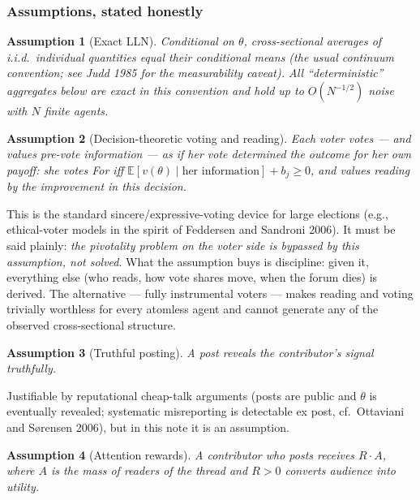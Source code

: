 \documentclass[12pt]{article}
\newtheorem{assumption}{Assumption}
\newcommand{\E}{\mathbb{E}}
\begin{document}
\subsubsection{Assumptions, stated honestly}

\begin{assumption}[Exact LLN]\label{app:ass:lln}
Conditional on $\theta$, cross-sectional averages of i.i.d.\ individual
quantities equal their conditional means (the usual continuum convention; see
Judd 1985 for the measurability caveat). All ``deterministic'' aggregates below
are exact in this convention and hold up to $O(N^{-1/2})$ noise with $N$ finite
agents.
\end{assumption}

\begin{assumption}[Decision-theoretic voting and reading]\label{app:ass:sincere}
Each voter votes --- and values pre-vote information --- \emph{as if her vote
determined the outcome for her own payoff}: she votes For iff
$\E[v(\theta)\mid\text{her information}]+b_j\ge 0$, and values reading by the
improvement in this decision.
\end{assumption}

This is the standard sincere/expressive-voting device for large elections
(e.g., ethical-voter models in the spirit of Feddersen and Sandroni 2006). It
must be said plainly: \emph{the pivotality problem on the voter side is bypassed
by this assumption, not solved}. What the assumption buys is discipline: given
it, everything else (who reads, how vote shares move, when the forum dies) is
derived. The alternative --- fully instrumental voters --- makes reading and
voting trivially worthless for every atomless agent and cannot generate any of
the observed cross-sectional structure.

\begin{assumption}[Truthful posting]\label{app:ass:truth}
A post reveals the contributor's signal truthfully.
\end{assumption}

Justifiable by reputational cheap-talk arguments (posts are public and
$\theta$ is eventually revealed; systematic misreporting is detectable ex post,
cf.\ Ottaviani and S{\o}rensen 2006), but in this note it is an assumption.

\begin{assumption}[Attention rewards]\label{app:ass:attention}
A contributor who posts receives $R\cdot A$, where $A$ is the mass of readers of
the thread and $R>0$ converts audience into utility.
\end{assumption}
\end{document}
